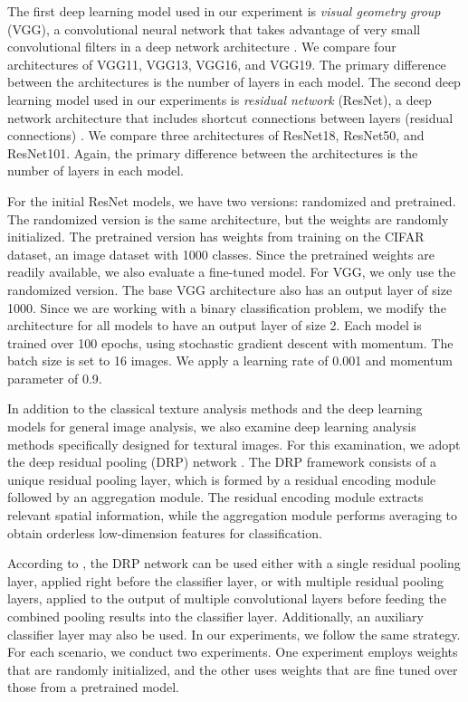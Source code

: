 \documentclass{aci}
\numberwithin{equation}{section}
\begin{document}
The first deep learning model used in our experiment is \textit{visual geometry
    group} (VGG), a convolutional neural network that takes advantage of very
small convolutional filters in a deep network architecture
\cite{simonyan_very_2015}. We compare four architectures of VGG11, VGG13,
VGG16, and VGG19. The primary difference between the architectures is the
number of layers in each model. The second deep learning model used in our
experiments is \textit{residual network} (ResNet), a deep network
architecture that includes shortcut connections between layers (residual
connections) \cite{he_deep_2015}. We compare three architectures of
ResNet18, ResNet50, and ResNet101. Again, the primary difference between the
architectures is the number of layers in each model.

For the initial ResNet models, we have two versions: randomized and pretrained.
The randomized version is the same architecture, but the weights are randomly
initialized. The pretrained version has weights from training on the CIFAR
dataset, an image dataset with 1000 classes. Since the pretrained weights are
readily available, we also evaluate a fine-tuned model. For VGG, we only use the
randomized version. The base VGG architecture also has an output layer of size
1000. Since we are working with a binary classification problem, we modify the
architecture for all models to have an output layer of size 2. Each model is
trained over 100 epochs, using stochastic gradient descent with momentum. The
batch size is set to 16 images. We apply a learning rate of 0.001 and momentum
parameter of 0.9.


In addition to the classical texture analysis methods and the deep learning
models for general image analysis, we also examine deep learning analysis
methods specifically designed for textural images. For this examination, we
adopt the deep residual pooling (DRP) network \cite{mao_deep_2021}. The DRP
framework consists of a unique residual pooling layer, which is formed by a
residual encoding module followed by an aggregation module. The residual
encoding module extracts relevant spatial information, while the aggregation
module performs averaging to obtain orderless low-dimension features for
classification.

According to \cite{mao_deep_2021}, the DRP network can be used either with a
single residual pooling layer, applied right before the classifier layer, or
with multiple residual pooling layers, applied to the output of multiple
convolutional layers before feeding the combined pooling results into the
classifier layer. Additionally, an auxiliary classifier layer may also be used.
In our experiments, we follow the same strategy. For each scenario, we conduct
two experiments. One experiment employs weights that are randomly initialized,
and the other uses weights that are fine tuned over those from a pretrained
model.
\end{document}
